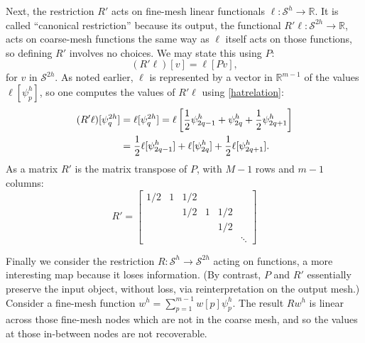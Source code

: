 \documentclass[letterpaper,final,12pt,reqno]{amsart}
\newcommand{\RR}{\mathbb{R}}
\begin{document}
Next, the restriction $R'$ acts on fine-mesh linear functionals $\ell:\mathcal{S}^h \to \RR$.  It is called ``canonical restriction'' \cite{GraeserKornhuber2009} because its output, the functional $R'\ell:\mathcal{S}^{2h}\to \RR$, acts on coarse-mesh functions the same way as $\ell$ itself acts on those functions, so defining $R'$ involves no choices.  We may state this using $P$:
\begin{equation}
  (R'\ell)[v] = \ell[Pv],  \label{rprimedefinition}
\end{equation}
for $v$ in $\mathcal{S}^{2h}$.  As noted earlier, $\ell$ is represented by a vector in $\RR^{m-1}$ of the values $\ell[\psi_p^h]$, so one computes the values of $R'\ell$ using \eqref{hatrelation}:
\begin{align}
  (R'\ell)[\psi_q^{2h}] &= \ell[\psi_q^{2h}] = \ell\left[\frac{1}{2} \psi_{2q-1}^h + \psi_{2q}^h + \frac{1}{2} \psi_{2q+1}^h\right]  \label{rprimeformula} \\
      &= \frac{1}{2} \ell[\psi_{2q-1}^h] + \ell[\psi_{2q}^h] + \frac{1}{2} \ell[\psi_{2q+1}^h].  \notag
\end{align}
As a matrix $R'$ is the matrix transpose of $P$, with $M-1$ rows and $m-1$ columns:
\begin{equation}
R' = \begin{bmatrix}
1/2 & 1 & 1/2 &   &     & \\
    &   & 1/2 & 1 & 1/2 & \\
    &   &     &   & 1/2 & \\
    &   &     &   &     & \ddots
\end{bmatrix} \label{rprimematrix}
\end{equation}

Finally we consider the restriction $R:\mathcal{S}^h\to\mathcal{S}^{2h}$ acting on functions, a more interesting map because it loses information.  (By contrast, $P$ and $R'$ essentially preserve the input object, without loss, via reinterpretation on the output mesh.)  Consider a fine-mesh function $w^h = \sum_{p=1}^{m-1} w[p] \psi_p^{h}$.  The result $R w^h$ is linear across those fine-mesh nodes which are not in the coarse mesh, and so the values at those in-between nodes are not recoverable.
\end{document}
